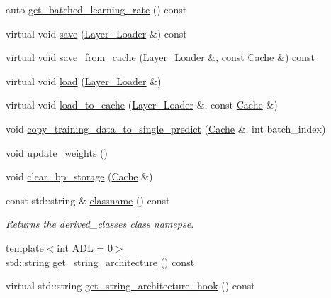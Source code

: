 \begin{DoxyCompactItemize}
auto \hyperlink{structbc_1_1nn_1_1Layer__Base_ae5fa2f2b97ec87c82cd98691dcb1ea91}{get\+\_\+batched\+\_\+learning\+\_\+rate} () const
\item 
virtual void \hyperlink{structbc_1_1nn_1_1Layer__Base_a9613e51db3c27e64ced09e41d2e7f15c}{save} (\hyperlink{structbc_1_1nn_1_1Layer__Loader}{Layer\+\_\+\+Loader} \&) const
\item 
virtual void \hyperlink{structbc_1_1nn_1_1Layer__Base_a7bcba1c84802ca8410ba4156c9bac64a}{save\+\_\+from\+\_\+cache} (\hyperlink{structbc_1_1nn_1_1Layer__Loader}{Layer\+\_\+\+Loader} \&, const \hyperlink{structbc_1_1nn_1_1Cache}{Cache} \&) const
\item 
virtual void \hyperlink{structbc_1_1nn_1_1Layer__Base_a5b3a9854215815f810bef4922b74efaf}{load} (\hyperlink{structbc_1_1nn_1_1Layer__Loader}{Layer\+\_\+\+Loader} \&)
\item 
virtual void \hyperlink{structbc_1_1nn_1_1Layer__Base_a6f479e0d594eca051dff122cdb3fe2a1}{load\+\_\+to\+\_\+cache} (\hyperlink{structbc_1_1nn_1_1Layer__Loader}{Layer\+\_\+\+Loader} \&, const \hyperlink{structbc_1_1nn_1_1Cache}{Cache} \&)
\item 
void \hyperlink{structbc_1_1nn_1_1Layer__Base_a2c4d5de71c469f678f929a9c02ee32a2}{copy\+\_\+training\+\_\+data\+\_\+to\+\_\+single\+\_\+predict} (\hyperlink{structbc_1_1nn_1_1Cache}{Cache} \&, int batch\+\_\+index)
\item 
void \hyperlink{structbc_1_1nn_1_1Layer__Base_a301f77da633513064795475c390a07e7}{update\+\_\+weights} ()
\item 
void \hyperlink{structbc_1_1nn_1_1Layer__Base_a17fbc289c15125d52550d011d076149c}{clear\+\_\+bp\+\_\+storage} (\hyperlink{structbc_1_1nn_1_1Cache}{Cache} \&)
\item 
const std\+::string \& \hyperlink{structbc_1_1nn_1_1Layer__Base_a3cae4e4c7061a12bb494886dc809c33b}{classname} () const
\begin{DoxyCompactList}\small\item\em Returns the derived\+\_\+classes class namepse. \end{DoxyCompactList}\item 
{\footnotesize template$<$int A\+DL = 0$>$ }\\std\+::string \hyperlink{structbc_1_1nn_1_1Layer__Base_ac29ced9ec2212afd843d87b8b661c036}{get\+\_\+string\+\_\+architecture} () const
\item 
virtual std\+::string \hyperlink{structbc_1_1nn_1_1Layer__Base_a0a1ff093d24d00868bc42419f75f181a}{get\+\_\+string\+\_\+architecture\+\_\+hook} () const

\end{DoxyCompactItemize}
